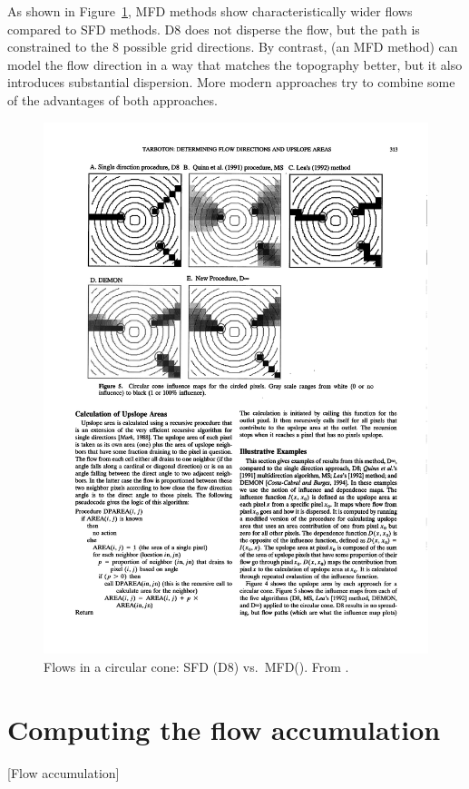 As shown in Figure~\ref{fig:dispersion}, MFD methods show characteristically wider flows compared to SFD methods.
D8 does not disperse the flow, but the path is constrained to the 8 possible grid directions.
By contrast, \citet{Quinn91} (an MFD method) can model the flow direction in a way that matches the topography better, but it also introduces substantial dispersion.
More modern approaches try to combine some of the advantages of both approaches.

\begin{figure}[htbp]
\centering
\includegraphics[width=0.95\linewidth]{figs/dispersion.pdf}
\caption{Flows in a circular cone: SFD (D8) vs.\ MFD\@ (\citet{Quinn91}). From \citet{Tarborton97}.}%
\label{fig:dispersion}
\end{figure}

\section{Computing the flow accumulation}[Flow accumulation]%
\label{se:accumulation}

